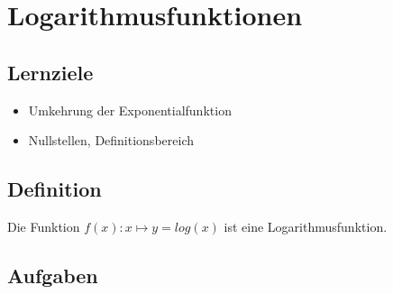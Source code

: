 
\section{Logarithmusfunktionen}
\subsection*{Lernziele}

\begin{itemize}
\item Umkehrung der Exponentialfunktion
\item Nullstellen, Definitionsbereich
\end{itemize}



\subsection{Definition}
Die Funktion $f(x): x \mapsto y = log(x)$ ist eine
Logarithmusfunktion.

\subsection*{Aufgaben}

